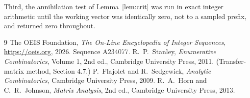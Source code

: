 \documentclass[11pt,a4paper]{article}
\theoremstyle{plain}
\theoremstyle{definition}
\begin{document}
Third, the annihilation test of Lemma~\ref{lem:crit} was run in exact integer arithmetic
until the working vector was identically zero, not to a sampled prefix, and returned zero
throughout.

\begin{thebibliography}{9}
 The OEIS Foundation, \emph{The On-Line Encyclopedia of Integer
Sequences}, \url{https://oeis.org}, 2026. Sequence A234077.
 R.~P.~Stanley, \emph{Enumerative Combinatorics}, Volume 1, 2nd ed.,
Cambridge University Press, 2011. (Transfer-matrix method, Section 4.7.)
 P.~Flajolet and R.~Sedgewick, \emph{Analytic Combinatorics}, Cambridge
University Press, 2009.
 R.~A.~Horn and C.~R.~Johnson, \emph{Matrix Analysis}, 2nd ed., Cambridge
University Press, 2013.
\end{thebibliography}
\end{document}
